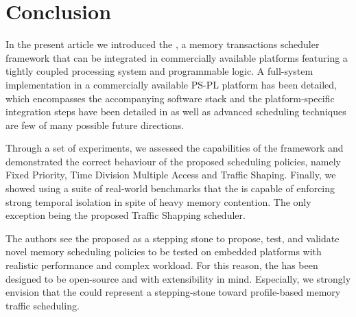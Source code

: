 \section{Conclusion}


In the present article we introduced the \schim, a memory transactions
scheduler framework that can be integrated in commercially available
platforms featuring a tightly coupled processing system and
programmable logic. A full-system implementation in a commercially
available PS-PL platform has been detailed, which encompasses the
accompanying software stack and the platform-specific integration
steps have been detailed in as well as advanced scheduling techniques
are few of many possible future directions.

Through a set of experiments, we assessed the capabilities of the
framework and demonstrated the correct behaviour of the proposed
scheduling policies, namely Fixed Priority, Time Division Multiple
Access and Traffic Shaping. Finally, we showed using a suite of
real-world benchmarks that the \schim is capable of enforcing strong
temporal isolation in spite of heavy memory contention. The only exception being the proposed Traffic Shapping scheduler.

The authors see the proposed \schim as a stepping stone to propose,
test, and validate novel memory scheduling policies to be tested on
embedded platforms with realistic performance and complex
workload. For this reason, the \schim has been designed to be
open-source and with extensibility in mind. Especially, we strongly
envision that the \schim could represent a stepping-stone toward
profile-based memory traffic scheduling.
